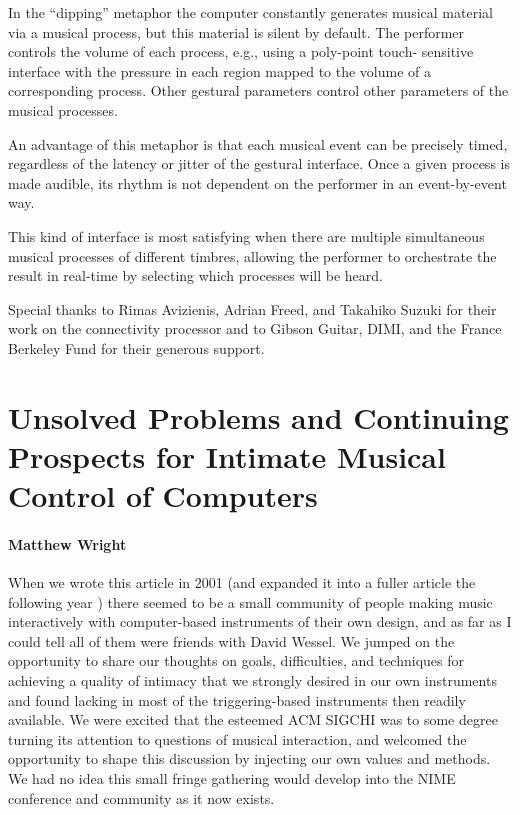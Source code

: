 In the ``dipping'' metaphor the computer constantly generates musical material via a musical process, but this material is silent by default. The performer controls the volume of each process, e.g., using a poly-point touch- sensitive interface with the pressure in each region mapped to the volume of a corresponding process. Other gestural parameters control other parameters of the musical processes.

An advantage of this metaphor is that each musical event can be precisely timed, regardless of the latency or jitter of the gestural interface. Once a given process is made audible, its rhythm is not dependent on the performer in an event-by-event way.

This kind of interface is most satisfying when there are multiple simultaneous musical processes of different timbres, allowing the performer to orchestrate the result in real-time by selecting which processes will be heard.


\begin{acknowledgement}
Special thanks to Rimas Avizienis, Adrian Freed, and Takahiko Suzuki for their work on the connectivity processor and to Gibson Guitar, DIMI, and the France Berkeley Fund for their generous support.
\end{acknowledgement}




\section*{Unsolved Problems and Continuing Prospects for Intimate Musical Control of Computers}

\paragraph{Matthew Wright}


When we wrote this article in 2001 (and expanded it into a fuller article the following year \cite{Wessel:2002}) there seemed to be a small community of people making music interactively with computer-based instruments of their own design, and as far as I could tell all of them were friends with David Wessel.  We jumped on the opportunity to share our thoughts on goals, difficulties, and techniques for achieving a quality of intimacy that we strongly desired in our own instruments and found lacking in most of the triggering-based instruments then readily available.  We were excited that the esteemed ACM SIGCHI was to some degree turning its attention to questions of musical interaction, and welcomed the opportunity to shape this discussion by injecting our own values and methods.  We had no idea this small fringe gathering would develop into the NIME conference and community as it now exists.

